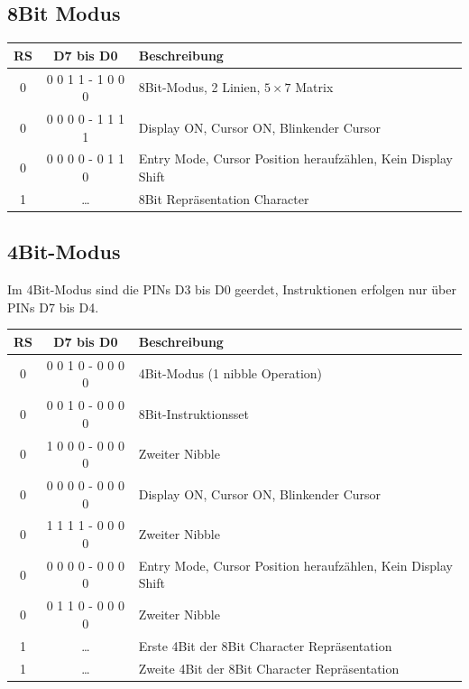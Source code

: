 \documentclass[a4paper,11pt]{article}
\begin{document}
\subsection*{8Bit Modus}
\begin{tabular}{| c | c | l |}
	\hline
	\textbf{RS} & \textbf{D7 bis D0} & \textbf{Beschreibung} \\\hline
	0 & 0 0 1 1 - 1 0 0 0 & 8Bit-Modus, 2 Linien, $5 \times 7$ Matrix \\\hline
	0 & 0 0 0 0 - 1 1 1 1 & Display ON, Cursor ON, Blinkender Cursor \\\hline
	0 & 0 0 0 0 - 0 1 1 0 & Entry Mode, Cursor Position heraufzählen, Kein Display Shift\\\hline
	1 & \ldots & 8Bit Repräsentation Character\\\hline
\end{tabular}

\subsection*{4Bit-Modus}
Im 4Bit-Modus sind die PINs D3 bis D0 geerdet, Instruktionen erfolgen nur über PINs D7 bis D4.
\begin{tabular}{| c | c | l |}
	\hline
	\textbf{RS} & \textbf{D7 bis D0} & \textbf{Beschreibung} \\\hline
	0 & 0 0 1 0 - 0 0 0 0 & 4Bit-Modus (1 nibble Operation)\\\hline
	0 & 0 0 1 0 - 0 0 0 0 & 8Bit-Instruktionsset \\\hline
	0 & 1 0 0 0 - 0 0 0 0 & Zweiter Nibble \\\hline
	
	0 & 0 0 0 0 - 0 0 0 0 & Display ON, Cursor ON, Blinkender Cursor\\\hline
	0 & 1 1 1 1 - 0 0 0 0 & Zweiter Nibble \\\hline
	
	0 & 0 0 0 0 - 0 0 0 0 &  Entry Mode, Cursor Position heraufzählen, Kein Display Shift\\\hline
	0 & 0 1 1 0 - 0 0 0 0 & Zweiter Nibble \\\hline
		
	
	
	1 & \ldots & Erste 4Bit der 8Bit Character Repräsentation \\\hline
	1 & \ldots & Zweite 4Bit der 8Bit Character Repräsentation \\\hline
\end{tabular}

\newpage
\end{document}
